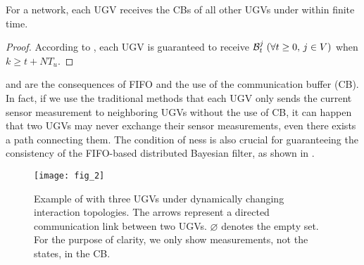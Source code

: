 	

	\begin{cor}\label{cor1}
		For a {\fc} network, each UGV receives the CBs of all other UGVs under {\proto} within finite time. 
	\end{cor}
	\begin{proof}
		According to ,
		each UGV is guaranteed to receive $\mathcal{B}^j_t\; (\forall t\ge 0,\, j\in V)$ when \small$k\geq t+NT_u$\normalsize.
		
	\end{proof}
	
	\begin{rem}
		\textcolor{\revcol}{
		 and  are the consequences of FIFO and the use of the communication buffer (CB). 
		In fact, if we use the traditional methods that each UGV only sends the current sensor measurement to neighboring UGVs without the use of CB, it can happen that two UGVs may never exchange their sensor measurements, even there exists a path connecting them.
		The condition of \fc ness is also crucial for guaranteeing the consistency of the FIFO-based distributed Bayesian filter, as shown in .
	}
	\end{rem}

	
	\begin{figure}%
		\centering
		\texttt{[image: fig\_2]}
		\caption{Example of {\proto} with three UGVs under dynamically changing interaction topologies. The arrows represent a directed communication link between two UGVs. $\varnothing$ denotes the empty set. For the purpose of clarity, we only show measurements, not the states, in the CB.}
		\label{fig:\proto}
	\end{figure}		